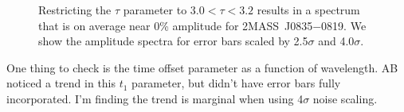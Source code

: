 \documentclass[twocolumn]{aastex6}
\newcommand{\sha}{2MASS~J0835$-$0819}
\begin{document}
\begin{figure}[!t]
\centering
{}
	\caption{Restricting the $\tau$ parameter to $3.0 < \tau < 3.2$ results in a spectrum that is on average near 0\% amplitude for \sha. We show the amplitude spectra for error bars scaled by 2.5$\sigma$ and 4.0$\sigma$.}
	\label{fig:ampSpec0835TauRestrict}
	\vspace{0.1in}
\end{figure} 

One thing to check is the time offset parameter as a function of wavelength.
AB noticed a trend in this $t_1$ parameter, but didn't have error bars fully incorporated.
I'm finding the trend is marginal when using 4$\sigma$ noise scaling.
\end{document}

